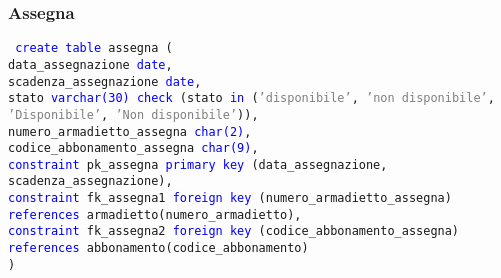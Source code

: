 \documentclass{article}
\begin{document}
    \subsubsection{Assegna}
    \begin{flushleft}
        \texttt{
        \textcolor{blue}{create table} assegna ( \\
        \hspace*{2em}data\_assegnazione \hspace*{4em}\textcolor{blue}{date}, \\
        \hspace*{2em}scadenza\_assegnazione \hspace*{2em}\textcolor{blue}{date}, \\
        \hspace*{2em}stato \hspace*{10em}\textcolor{blue}{varchar(30)} \hspace*{1.8em}\textcolor{blue}{check} (stato \textcolor{blue}{in} (\textcolor{gray}{'disponibile'}, \textcolor{gray}{\hspace*{2em}'non disponibile'}, \textcolor{gray}{'Disponibile'}, \textcolor{gray}{'Non disponibile'})), \\
        \hspace*{2em}numero\_armadietto\_assegna \hspace*{2em}\textcolor{blue}{char(2)}, \\
        \hspace*{2em}codice\_abbonamento\_assegna \hspace*{2em}\textcolor{blue}{char(9)}, \\
        \hspace*{2em}\textcolor{blue}{constraint} pk\_assegna \textcolor{blue}{primary key} (data\_assegnazione, scadenza\_assegnazione), \\
        \hspace*{2em}\textcolor{blue}{constraint} fk\_assegna1 \textcolor{blue}{foreign key} (numero\_armadietto\_assegna) \textcolor{blue}{references} \hspace*{2em}armadietto(numero\_armadietto), \\
        \hspace*{2em}\textcolor{blue}{constraint} fk\_assegna2 \textcolor{blue}{foreign key} (codice\_abbonamento\_assegna) \textcolor{blue}{references} \hspace*{2em}abbonamento(codice\_abbonamento) \\)}
    \end{flushleft}
\end{document}
